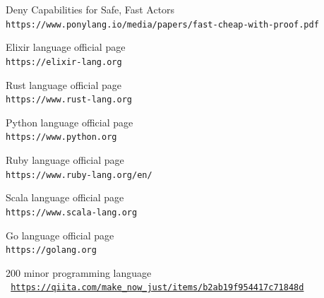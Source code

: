\documentclass{article}
\begin{document}
\begin{multicols}{2}
\begin{thebibliography}{9}
Deny Capabilities for Safe, Fast Actors
\\\texttt{https://www.ponylang.io/media/papers/fast-cheap-with-proof.pdf}

Elixir language official page
\\\texttt{https://elixir-lang.org}

Rust language official page
\\\texttt{https://www.rust-lang.org}

Python language official page
\\\texttt{https://www.python.org}

Ruby language official page
\\\texttt{https://www.ruby-lang.org/en/}
	
Scala language official page
\\\texttt{https://www.scala-lang.org}

Go language official page
\\\texttt{https://golang.org}
	

200 minor programming language
\\\texttt{ \url{https://qiita.com/make_now_just/items/b2ab19f954417c71848d} }

\end{thebibliography}
\end{multicols}
\end{document}
